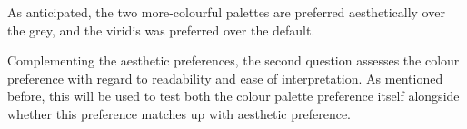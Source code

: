 \documentclass[
]{article}
\newenvironment{Shaded}{\begin{snugshade}}{\end{snugshade}}
\newcommand{\DecValTok}[1]{\textcolor[rgb]{0.00,0.00,0.81}{#1}}
\newcommand{\NormalTok}[1]{#1}
\newcommand{\OperatorTok}[1]{\textcolor[rgb]{0.81,0.36,0.00}{\textbf{#1}}}
\newcommand{\StringTok}[1]{\textcolor[rgb]{0.31,0.60,0.02}{#1}}
\begin{document}
As anticipated, the two more-colourful palettes are preferred
aesthetically over the grey, and the viridis was preferred over the
default.

Complementing the aesthetic preferences, the second question assesses
the colour preference with regard to readability and ease of
interpretation. As mentioned before, this will be used to test both the
colour palette preference itself alongside whether this preference
matches up with aesthetic preference.

\begin{Shaded}
\end{Shaded}
\end{document}
